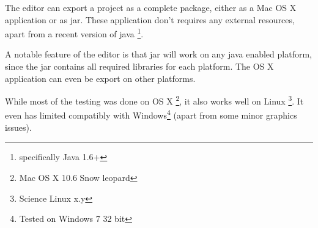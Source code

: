 The editor can export a project as a complete package, either as a Mac OS X application or as jar. These application don't requires any external resources, apart from a recent version of java \footnote{specifically Java 1.6+}.

A notable feature of the editor is that jar will work on any java enabled platform, since the jar contains all required libraries for each platform. The OS X application can even be export on other platforms.

While most of the testing was done on OS X \footnote{Mac OS X 10.6 Snow leopard}, it also works well on Linux \footnote{Science  Linux x.y}. It even has limited compatibly with Windows\footnote{Tested on Windows 7 32 bit} (apart from some minor graphics issues).